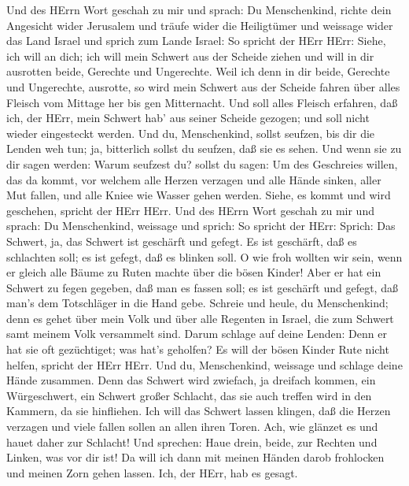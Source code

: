  Und des HErrn Wort geschah zu mir und sprach: 
Du Menschenkind, richte dein Angesicht wider Jerusalem und träufe wider
die Heiligtümer und weissage wider das Land Israel  und
sprich zum Lande Israel: So spricht der HErr HErr: Siehe, ich will an
dich; ich will mein Schwert aus der Scheide ziehen und will in dir
ausrotten beide, Gerechte und Ungerechte.  Weil ich denn in
dir beide, Gerechte und Ungerechte, ausrotte, so wird mein Schwert aus
der Scheide fahren über alles Fleisch vom Mittage her bis gen
Mitternacht.  Und soll alles Fleisch erfahren, daß ich, der
HErr, mein Schwert hab' aus seiner Scheide gezogen; und soll nicht
wieder eingesteckt werden.  Und du, Menschenkind, sollst
seufzen, bis dir die Lenden weh tun; ja, bitterlich sollst du seufzen,
daß sie es sehen.  Und wenn sie zu dir sagen werden: Warum
seufzest du? sollst du sagen: Um des Geschreies willen, das da kommt,
vor welchem alle Herzen verzagen und alle Hände sinken, aller Mut
fallen, und alle Kniee wie Wasser gehen werden. Siehe, es kommt und wird
geschehen, spricht der HErr HErr.  Und des HErrn Wort
geschah zu mir und sprach:  Du Menschenkind, weissage und
sprich: So spricht der HErr: Sprich: Das Schwert, ja, das Schwert ist
geschärft und gefegt.  Es ist geschärft, daß es schlachten
soll; es ist gefegt, daß es blinken soll. O wie froh wollten wir sein,
wenn er gleich alle Bäume zu Ruten machte über die bösen Kinder!
 Aber er hat ein Schwert zu fegen gegeben, daß man es
fassen soll; es ist geschärft und gefegt, daß man's dem Totschläger in
die Hand gebe.  Schreie und heule, du Menschenkind; denn es
gehet über mein Volk und über alle Regenten in Israel, die zum Schwert
samt meinem Volk versammelt sind. Darum schlage auf deine Lenden:
 Denn er hat sie oft gezüchtiget; was hat's geholfen? Es
will der bösen Kinder Rute nicht helfen, spricht der HErr HErr.
 Und du, Menschenkind, weissage und schlage deine Hände
zusammen. Denn das Schwert wird zwiefach, ja dreifach kommen, ein
Würgeschwert, ein Schwert großer Schlacht, das sie auch treffen wird in
den Kammern, da sie hinfliehen.  Ich will das Schwert
lassen klingen, daß die Herzen verzagen und viele fallen sollen an allen
ihren Toren. Ach, wie glänzet es und hauet daher zur Schlacht!
 Und sprechen: Haue drein, beide, zur Rechten und Linken,
was vor dir ist!  Da will ich dann mit meinen Händen darob
frohlocken und meinen Zorn gehen lassen. Ich, der HErr, hab es gesagt.
